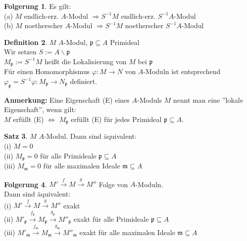 \documentclass[10pt,a4paper,numbers=endperiod]{scrreprt}
\theoremstyle{definition}
\newtheorem{satz}{Satz}[section]
\newtheorem{defi}[satz]{Definition}
\newtheorem{folg}[satz]{Folgerung}
\begin{document}
\begin{folg}
	Es gilt:\\
	(a) $M$ endlich-erz. $A$-Modul $\Rightarrow S^{-1} M$ endlich-erz. $S^{-1}A$-Modul\\
	(b) $M$ noetherscher $A$-Modul $\Rightarrow S^{-1}M$ noetherscher $S^{-1}A$-Modul
\end{folg}

\begin{defi}
	$M$ $A$-Modul, $\mathfrak{p} \subseteq A$ Primideal\\
	Wir setzen $S := A \backslash \mathfrak{p}$\\
	$M_{\mathfrak{p}} := S^{-1}M$ heißt die Lokalisierung von $M$ bei $\mathfrak{p}$\\
	Für einen Homomorphismus $\varphi: M \to N$ von $A$-Moduln ist entsprechend $\varphi_{\mathfrak{p}} = S^{-1}\varphi: M_{\mathfrak{p}} \to N_{\mathfrak{p}}$ definiert.
\end{defi}

\textbf{Anmerkung:} Eine Eigenschaft (E) eines $A$-Moduls $M$ nennt man eine ''lokale Eigenschaft'', wenn gilt:\\
$M$ erfüllt (E) $\Leftrightarrow$ $M_{\mathfrak{p}}$ erfüllt (E) für jedes Primideal $\mathfrak{p} \subseteq A$.

\begin{satz}
	$M$ $A$-Modul. Dann sind äquivalent:\\
	(i) $M = 0$\\
	(ii) $M_{\mathfrak{p}} = 0$ für alle Primideale $\mathfrak{p} \subseteq A$\\
	(iii) $M_{\mathfrak{m}} = 0$ für alle maximalen Ideale $\mathfrak{m} \subseteq A$
\end{satz}

\begin{folg}
	$M' \overset{f}{\to} M \overset{g}{\to} M''$ Folge von $A$-Moduln.\\
	Dann sind äquivalent:\\
	(i) $M' \overset{f}{\to} M \overset{g}{\to} M''$ exakt\\
	(ii) $M'_{\mathfrak{p}} \overset{f_{\mathfrak{p}}}{\to} M_{\mathfrak{p}} \overset{g_{\mathfrak{p}}}{\to} M''_{\mathfrak{p}}$ exakt für alle Primideale $\mathfrak{p} \subseteq A$\\
	(iii) $M'_{\mathfrak{m}} \overset{f_{\mathfrak{m}}}{\to} M_{\mathfrak{m}} \overset{g_{\mathfrak{m}}}{\to} M''_{\mathfrak{m}}$ exakt für alle maximalen Ideale $\mathfrak{m} \subseteq A$\\	
\end{folg}
\end{document}
